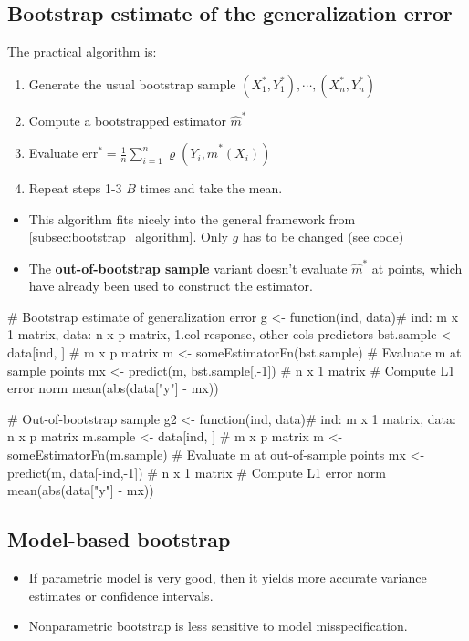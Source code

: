  \subsection{Bootstrap estimate of the generalization error}
 \begin{theory}
  The practical algorithm is:
  \begin{enumerate}
   \item Generate the usual bootstrap sample $(X_1^{\ast}, Y_1^{\ast}), \cdots, (X_n^{\ast}, Y_n^{\ast})$
   \item Compute a bootstrapped estimator $\hat{m}^{\ast}$
   \item Evaluate $\text{err}^{\ast} = \frac{1}{n} \sum_{i=1}^n \varrho(Y_i, \hat{m}^{\ast}(X_i))$
   \item Repeat steps 1-3 $B$ times and take the mean.
  \end{enumerate}
  \begin{itemize}
   \item This algorithm fits nicely into the general framework from \ref{subsec:bootstrap_algorithm}. Only $g$ has to be changed (see code)
   \item The \textbf{out-of-bootstrap sample} variant doesn't evaluate $\hat{m}^{\ast}$ at points, which have already been used to construct the estimator.
  \end{itemize}
 \end{theory}

 \begin{code}
  # Bootstrap estimate of generalization error
  g <- function(ind, data){# ind: m x 1 matrix, data: n x p matrix, 1.col response, other cols predictors
    bst.sample <- data[ind, ] # m x p matrix
    m <- someEstimatorFn(bst.sample)
    # Evaluate m at sample points
    mx <- predict(m, bst.sample[,-1]) # n x 1 matrix
    # Compute L1 error norm
    mean(abs(data["y"] - mx))
  }
  
  # Out-of-bootstrap sample
  g2 <- function(ind, data){# ind: m x 1 matrix, data: n x p matrix
    m.sample <- data[ind, ] # m x p matrix
    m <- someEstimatorFn(m.sample)
    # Evaluate m at out-of-sample points
    mx <- predict(m, data[-ind,-1]) # n x 1 matrix
    # Compute L1 error norm
    mean(abs(data["y"] - mx))
  }
 \end{code}

 \subsection{Model-based bootstrap}
 \begin{application}
 \begin{itemize}
  \item[\leftthumbsup] If parametric model is very good, then it yields more accurate variance estimates or confidence intervals.
  \item[\leftthumbsdown] Nonparametric bootstrap is less sensitive to model misspecification.
 \end{itemize}
 \end{application}
 
